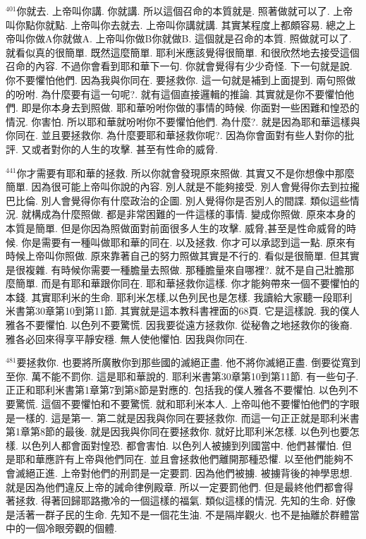 \documentclass{book}
\begin{document}
$^{401}$你就去.
上帝叫你講.
你就講.
所以這個召命的本質就是.
照著做就可以了.
上帝叫你點你就點.
上帝叫你去就去.
上帝叫你講就講.
其實某程度上都頗容易.
總之上帝叫你做A你就做A.
上帝叫你做B你就做B.
這個就是召命的本質.
照做就可以了.
就看似真的很簡單.
既然這麼簡單.
耶利米應該覺得很簡單.
和很欣然地去接受這個召命的內容.
不過你會看到耶和華下一句.
你就會覺得有少少奇怪.
下一句就是說.
你不要懼怕他們.
因為我與你同在.
要拯救你.
這一句就是補到上面提到.
兩句照做的吩咐.
為什麼要有這一句呢?.
就有這個直接邏輯的推論.
其實就是你不要懼怕他們.
即是你本身去到照做.
耶和華吩咐你做的事情的時候.
你面對一些困難和惶恐的情況.
你害怕.
所以耶和華就吩咐你不要懼怕他們.
為什麼?.
就是因為耶和華這樣與你同在.
並且要拯救你.
為什麼要耶和華拯救你呢?.
因為你會面對有些人對你的批評.
又或者對你的人生的攻擊.
甚至有性命的威脅.

$^{441}$你才需要有耶和華的拯救.
所以你就會發現原來照做.
其實又不是你想像中那麼簡單.
因為很可能上帝叫你說的內容.
別人就是不能夠接受.
別人會覺得你去到拉攏巴比倫.
別人會覺得你有什麼政治的企圖.
別人覺得你是否別人的間諜.
類似這些情況.
就構成為什麼照做.
都是非常困難的一件這樣的事情.
變成你照做.
原來本身的本質是簡單.
但是你因為照做面對前面很多人生的攻擊.
威脅,甚至是性命威脅的時候.
你是需要有一種叫做耶和華的同在.
以及拯救.
你才可以承認到這一點.
原來有時候上帝叫你照做.
原來靠著自己的努力照做其實是不行的.
看似是很簡單.
但其實是很複雜.
有時候你需要一種膽量去照做.
那種膽量來自哪裡?.
就不是自己壯膽那麼簡單.
而是有耶和華跟你同在.
耶和華拯救你這樣.
你才能夠帶來一個不要懼怕的本錢.
其實耶利米的生命.
耶利米怎樣,以色列民也是怎樣.
我讀給大家聽一段耶利米書第30章第10到第11節.
其實就是這本教科書裡面的68頁.
它是這樣說.
我的僕人雅各不要懼怕.
以色列不要驚慌.
因我要從遠方拯救你.
從秘魯之地拯救你的後裔.
雅各必回來得享平靜安穩.
無人使他懼怕.
因我與你同在.

$^{481}$要拯救你.
也要將所廣散你到那些國的滅絕正盡.
他不將你滅絕正盡.
倒要從寬到至你.
萬不能不罰你.
這是耶和華說的.
耶利米書第30章第10到第11節.
有一些句子.
正正和耶利米書第1章第7到第8節是對應的.
包括我的僕人雅各不要懼怕.
以色列不要驚慌.
這個不要懼怕和不要驚慌.
就和耶利米本人.
上帝叫他不要懼怕他們的字眼是一樣的.
這是第一.
第二就是因我與你同在要拯救你.
而這一句正正就是耶利米書第1章第8節的最後.
就是因我與你同在要拯救你.
就好比耶利米怎樣.
以色列也要怎樣.
以色列人都會面對惶恐.
都會害怕.
以色列人被擄到列國當中.
他們甚懼怕.
但是耶和華應許有上帝與他們同在.
並且會拯救他們離開那種恐懼.
以至他們能夠不會滅絕正進.
上帝對他們的刑罰是一定要罰.
因為他們被擄.
被擄背後的神學思想.
就是因為他們違反上帝的誡命律例殿章.
所以一定要罰他們.
但是最終他們都會得著拯救.
得著回歸耶路撒冷的一個這樣的福氣.
類似這樣的情況.
先知的生命.
好像是活著一群子民的生命.
先知不是一個花生油.
不是隔岸觀火.
也不是抽離於群體當中的一個冷眼旁觀的個體.
\end{document}
